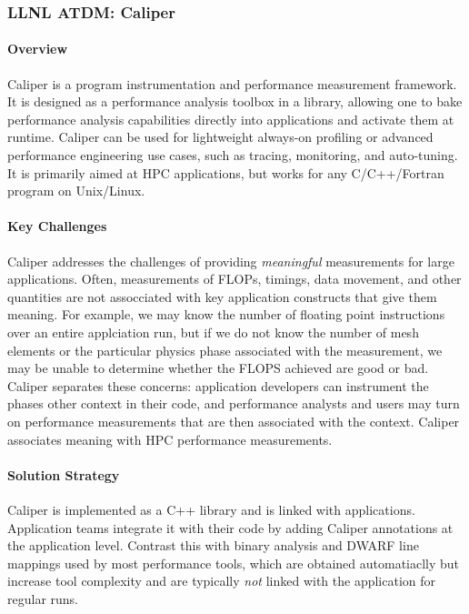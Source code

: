\subsubsection{ LLNL ATDM: Caliper}

\paragraph{Overview}

Caliper is a program instrumentation and performance measurement
framework. It is designed as a performance analysis toolbox in a library,
allowing one to bake performance analysis capabilities directly into
applications and activate them at runtime. Caliper can be used for
lightweight always-on profiling or advanced performance engineering use
cases, such as tracing, monitoring, and auto-tuning. It is primarily
aimed at HPC applications, but works for any C/C++/Fortran program on
Unix/Linux.

\paragraph{Key Challenges}

Caliper addresses the challenges of providing {\it meaningful}
measurements for large applications.  Often, measurements of FLOPs,
timings, data movement, and other quantities are not assocciated with key
application constructs that give them meaning.  For example, we may know
the number of floating point instructions over an entire applciation run,
but if we do not know the number of mesh elements or the particular
physics phase associated with the measurement, we may be unable to
determine whether the FLOPS achieved are good or bad.  Caliper separates
these concerns: application developers can instrument the phases other
context in their code, and performance analysts and users may turn on
performance measurements that are then associated with the context.
Caliper associates meaning with HPC performance measurements.

\paragraph{Solution Strategy}

Caliper is implemented as a C++ library and is linked with applications.
Application teams integrate it with their code by adding Caliper
annotations at the application level.  Contrast this with binary analysis
and DWARF line mappings used by most performance tools, which are
obtained automatiaclly but increase tool complexity and are typically
{\it not} linked with the application for regular runs.

